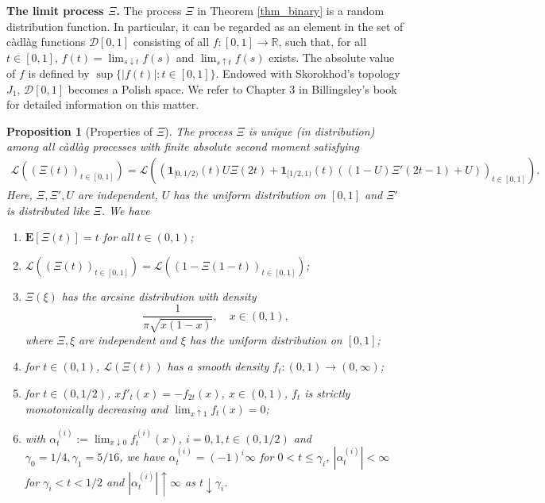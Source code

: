 \documentclass{amsart}       %
\newcommand{\R}{\ensuremath{\mathbb{R}}}
\newcommand{\E}[1]{\ensuremath{\mathbf{E} \left[#1 \right]}}
\newcommand{\I}[1]{\ensuremath{\mathbf{1}_{  #1  }}}
\newcommand{\Law}{\mathcal{L}}
\newtheorem{proposition}{Proposition}
\begin{document}
\medskip  \textbf{The limit process $\Xi$.} The process $\Xi$ in Theorem \ref{thm_binary} is a random distribution function. In particular, it can be regarded as an element in the set of c{\`a}dl{\`a}g functions $\mathcal{D}[0,1]$ consisting of all $f: [0,1] \to \R$, such that, for all $t \in [0,1]$, $f(t) = \lim_{s \downarrow t} f(s)$ and $\lim_{s \uparrow t} f(s)$ exists. The absolute value of $f$ is defined by $\sup \{|f(t)| : t \in [0,1]\}$. Endowed with Skorokhod's topology $J_1$, $\mathcal{D}[0,1]$ becomes a Polish space. We refer to Chapter 3 in  Billingsley's book \cite{bil99} for detailed information on this matter.
\begin{proposition}[Properties of $\Xi$] \label{propxi}
 The process $\Xi$ is unique (in distribution) among all c{\`a}dl{\`a}g processes with finite absolute second moment satisfying 
\begin{align} \label{fix_process}
\Law((\Xi(t))_{t \in [0,1]}) = \Law(\left( \I{[0,1/2)}(t) U \Xi(2t) +  \I{[1/2,1)}(t) \left( (1-U) \Xi'(2t-1) + U \right) \right)_{t \in [0,1]}).
\end{align} 
Here, $\Xi, \Xi', U$ are independent, $U$ has the uniform distribution on $[0,1]$ and $\Xi'$ is distributed like $\Xi$.
We have
\begin{enumerate} 
\item   $\E{\Xi(t)} = t$ for all $t \in (0,1)$;
\item  $\Law( (\Xi(t))_{t \in [0,1]} ) = \Law ( (1 - \Xi(1-t))_{t \in [0,1]})$;
\item $\Xi(\xi)$ has the arcsine distribution with density
$$\frac{1}{\pi \sqrt{x(1-x)}}, \quad x \in (0,1),$$
where $\Xi, \xi$ are independent and $\xi$ has the uniform distribution on $[0,1]$;
\item for $t \in (0,1)$, $\Law(\Xi(t))$ has a smooth density $f_t: (0,1) \to (0, \infty)$;
\item for $t \in (0,1/2)$,  $x f'_t(x) = - f_{2t}(x)$, $x \in (0,1)$, $f_t$ is strictly monotonically decreasing and $\lim_{x \uparrow 1} f_t(x) = 0$;
\item with $\alpha^{(i)}_t := \lim_{x \downarrow 0} f^{(i)}_t(x)$, $i = 0,1, t \in (0,1/2)$ and $\gamma_0 = 1/4, \gamma_1 = 5/16$,  we have $\alpha^{(i)}_t =  (-1)^i \infty$  for $0 < t \leq \gamma_i$, $|\alpha^{(i)}_t| < \infty$ for $\gamma_i < t < 1/2$ and $|\alpha^{(i)}_t| \uparrow  \infty$ as $t \downarrow \gamma_i$.
\end{enumerate}
\end{proposition}
\end{document}
